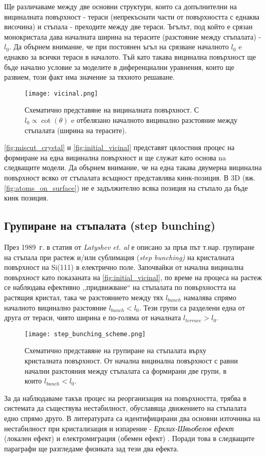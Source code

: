 Ще различаваме между две основни структури, които са допълнителни на вициналната повърхност - тераси (непрекъснати части от повърхността с еднаква височина) и стъпала - преходите между две тераси. Ъгълът, под който е срязан монокристала дава началната ширина на терасите (разстояние между стъпалата) - $l_0$. Да обърнем внимание, че при постоянен ъгъл на срязване началното $l_0$ e еднакво за всички тераси в началото. Тъй като такава вицинална повърхност ще бъде начално условие за моделите в диференциални уравнения, които ще развием, този факт има значение за тяхното решаване.
\begin{figure}[htbp]
	\centering
	\texttt{[image: vicinal.png]}
	\caption{Схематично представяне на вициналната повърхност. С $l_0  \propto \cot{\left( \theta \right)} $ e отбелязано началното вицинално разстояние между стъпалата (ширина на терасите).}
	\label{fig:initial_vicinal}
\end{figure}

\autoref{fig:miscut_crystal} и \autoref{fig:initial_vicinal} представят цялостния процес на формиране на една вицинална повърхност и ще служат като основа na следващите модели. Да обърнем внимание, че на една такава двумерна вицинална повърхност всяко от стъпалата всъщност представлява кинк-позиция. В 3D (вж. \autoref{fig:atoms_on_surface}) не е задължително всяка позиция на стъпало да бъде кинк позиция.
\subsection{Групиране на стъпалата (step bunching)}
През 1989~г. в статия от \textit{Latyshev et. al} \cite{Latyshev1989} е описано за пръв път т.нар. групиране на стъпала при растеж и/или сублимация (\textit{step bunching)} на кристалната повърхност на Si(111) в електрично поле. Започвайки от начална вицинална повърхност като показаната на \autoref{fig:initial_vicinal}, по време на процеса на растеж се наблюдава ефективно ,,придвижване`` на стъпалата по повърхността на растящия кристал, така че разстоянието между тях $l_{bunch}$ намалява спрямо началното вицинално разстояние $l_{bunch} < l_0$. Тези групи са разделени една от друга от тераси, чиято ширина е по-голяма от началната $l_{terrace}  > l_0$.
\begin{figure}[htbp]
	\centering
	\texttt{[image: step\_bunching\_scheme.png]}
	\caption{Схематично представяне на групиране на стъпалата върху кристалната повърхност. От начална вицинална повърхност с равни начални разстояния между стъпалата са формирани две групи, в които $l_{bunch} < l_0$.}
	\label{fig:step_bunching}
\end{figure}
За да наблюдаваме такъв процес на реорганизация на повърхността, трябва в системата да съществува нестабилност, обуславяща движението на стъпалата едно спрямо друго. В литературата \cite{StoyanStoyanov1991}\cite{TonchevArxiv2012} са идентифицирани два основни източника на нестабилност при кристализация и изпарение - \textit{Ерхлих-Швьобелов ефект} (локален ефект) \cite{Ehrlich1966} \cite{Schwoebel1966} и електромиграция (обемен ефект) \cite{Latyshev1989}. Поради това в следващите параграфи ще разгледаме физиката зад тези два ефекта.
